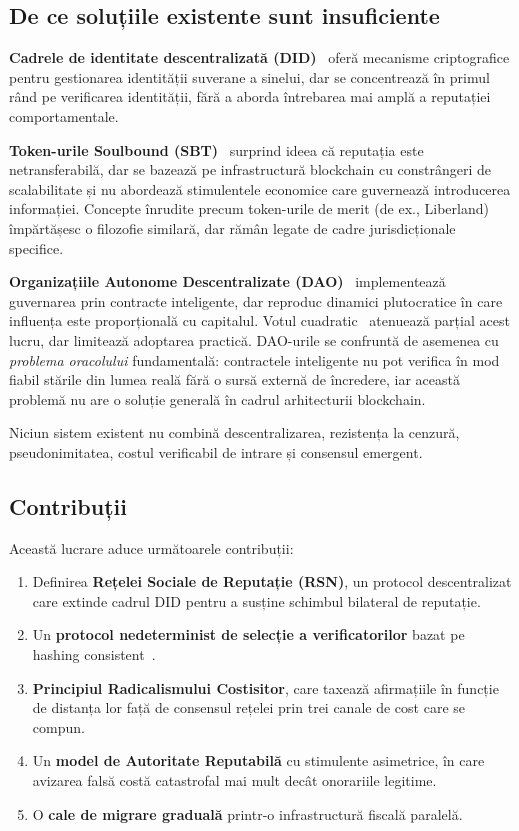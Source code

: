 \documentclass[11pt,a4paper,twocolumn]{article}
\begin{document}
\subsection{De ce soluțiile existente sunt insuficiente}

\textbf{Cadrele de identitate descentralizată (DID)}~\cite{did2022} oferă mecanisme criptografice pentru gestionarea identității suverane a sinelui, dar se concentrează în primul rând pe verificarea identității, fără a aborda întrebarea mai amplă a reputației comportamentale.

\textbf{Token-urile Soulbound (SBT)}~\cite{weyl2022} surprind ideea că reputația este netransferabilă, dar se bazează pe infrastructură blockchain cu constrângeri de scalabilitate și nu abordează stimulentele economice care guvernează introducerea informației. Concepte înrudite precum token-urile de merit (de ex., Liberland) împărtășesc o filozofie similară, dar rămân legate de cadre jurisdicționale specifice.

\textbf{Organizațiile Autonome Descentralizate (DAO)}~\cite{buterin2014} implementează guvernarea prin contracte inteligente, dar reproduc dinamici plutocratice în care influența este proporțională cu capitalul. Votul cuadratic~\cite{buterin2019} atenuează parțial acest lucru, dar limitează adoptarea practică. DAO-urile se confruntă de asemenea cu \emph{problema oracolului} fundamentală: contractele inteligente nu pot verifica în mod fiabil stările din lumea reală fără o sursă externă de încredere, iar această problemă nu are o soluție generală în cadrul arhitecturii blockchain.

Niciun sistem existent nu combină descentralizarea, rezistența la cenzură, pseudonimitatea, costul verificabil de intrare și consensul emergent.

\subsection{Contribuții}

Această lucrare aduce următoarele contribuții:
\begin{enumerate}[nosep]
\item Definirea \textbf{Rețelei Sociale de Reputație (RSN)}, un protocol descentralizat care extinde cadrul DID pentru a susține schimbul bilateral de reputație.
\item Un \textbf{protocol nedeterminist de selecție a verificatorilor} bazat pe hashing consistent~\cite{karger1997}.
\item \textbf{Principiul Radicalismului Costisitor}, care taxează afirmațiile în funcție de distanța lor față de consensul rețelei prin trei canale de cost care se compun.
\item Un \textbf{model de Autoritate Reputabilă} cu stimulente asimetrice, în care avizarea falsă costă catastrofal mai mult decât onorariile legitime.
\item O \textbf{cale de migrare graduală} printr-o infrastructură fiscală paralelă.
\end{enumerate}
\end{document}
